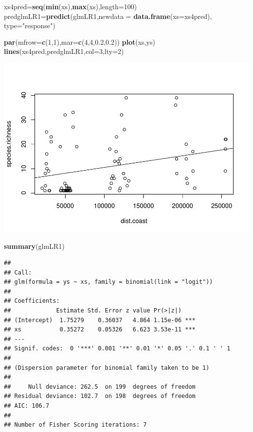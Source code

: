 \documentclass[
]{book}
\newenvironment{Shaded}{\begin{snugshade}}{\end{snugshade}}
\newcommand{\AttributeTok}[1]{\textcolor[rgb]{0.13,0.29,0.53}{#1}}
\newcommand{\DecValTok}[1]{\textcolor[rgb]{0.00,0.00,0.81}{#1}}
\newcommand{\FloatTok}[1]{\textcolor[rgb]{0.00,0.00,0.81}{#1}}
\newcommand{\FunctionTok}[1]{\textcolor[rgb]{0.13,0.29,0.53}{\textbf{#1}}}
\newcommand{\NormalTok}[1]{#1}
\newcommand{\OtherTok}[1]{\textcolor[rgb]{0.56,0.35,0.01}{#1}}
\newcommand{\StringTok}[1]{\textcolor[rgb]{0.31,0.60,0.02}{#1}}
\begin{document}
\begin{Shaded}
\begin{Highlighting}[]
\NormalTok{xs4pred}\OtherTok{=}\FunctionTok{seq}\NormalTok{(}\FunctionTok{min}\NormalTok{(xs),}\FunctionTok{max}\NormalTok{(xs),}\AttributeTok{length=}\DecValTok{100}\NormalTok{)}
\NormalTok{predglmLR1}\OtherTok{=}\FunctionTok{predict}\NormalTok{(glmLR1,}\AttributeTok{newdata =} \FunctionTok{data.frame}\NormalTok{(}\AttributeTok{xs=}\NormalTok{xs4pred),}
\AttributeTok{type=}\StringTok{"response"}\NormalTok{)}

\FunctionTok{par}\NormalTok{(}\AttributeTok{mfrow=}\FunctionTok{c}\NormalTok{(}\DecValTok{1}\NormalTok{,}\DecValTok{1}\NormalTok{),}\AttributeTok{mar=}\FunctionTok{c}\NormalTok{(}\DecValTok{4}\NormalTok{,}\DecValTok{4}\NormalTok{,}\FloatTok{0.2}\NormalTok{,}\FloatTok{0.2}\NormalTok{))}
\FunctionTok{plot}\NormalTok{(xs,ys)}
\FunctionTok{lines}\NormalTok{(xs4pred,predglmLR1,}\AttributeTok{col=}\DecValTok{3}\NormalTok{,}\AttributeTok{lty=}\DecValTok{2}\NormalTok{)}
\end{Highlighting}
\end{Shaded}

\includegraphics{ECOMODbook_files/figure-latex/unnamed-chunk-43-1.pdf}

\begin{Shaded}
\begin{Highlighting}[]
\FunctionTok{summary}\NormalTok{(glmLR1)}
\end{Highlighting}
\end{Shaded}

\begin{verbatim}
## 
## Call:
## glm(formula = ys ~ xs, family = binomial(link = "logit"))
## 
## Coefficients:
##             Estimate Std. Error z value Pr(>|z|)    
## (Intercept)  1.75279    0.36037   4.864 1.15e-06 ***
## xs           0.35272    0.05326   6.623 3.53e-11 ***
## ---
## Signif. codes:  0 '***' 0.001 '**' 0.01 '*' 0.05 '.' 0.1 ' ' 1
## 
## (Dispersion parameter for binomial family taken to be 1)
## 
##     Null deviance: 262.5  on 199  degrees of freedom
## Residual deviance: 102.7  on 198  degrees of freedom
## AIC: 106.7
## 
## Number of Fisher Scoring iterations: 7
\end{verbatim}
\end{document}
